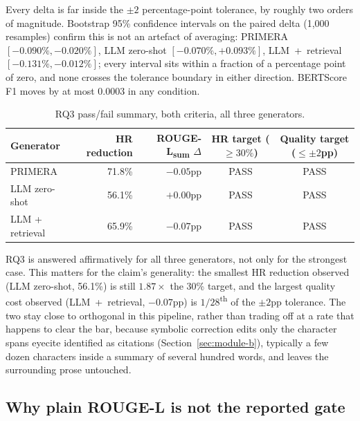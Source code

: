 Every delta is far inside the $\pm 2$ percentage-point tolerance, by roughly two orders of magnitude. Bootstrap 95\% confidence intervals on the paired delta (1{,}000 resamples) confirm this is not an artefact of averaging: PRIMERA $[-0.090\%, -0.020\%]$, LLM zero-shot $[-0.070\%, +0.093\%]$, LLM~+~retrieval $[-0.131\%, -0.012\%]$; every interval sits within a fraction of a percentage point of zero, and none crosses the tolerance boundary in either direction. BERTScore F1 moves by at most 0.0003 in any condition.

\begin{table}[!t]
\centering
\caption{RQ3 pass/fail summary, both criteria, all three generators.}
\label{tab:rq3-pass}
\begin{tabular}{@{}lrrcc@{}}
\toprule
\textbf{Generator} & \textbf{HR reduction} & \textbf{ROUGE-L\textsubscript{sum} $\Delta$} & \textbf{HR target ($\geq 30\%$)} & \textbf{Quality target ($\leq \pm 2$pp)} \\
\midrule
PRIMERA         & 71.8\% & $-0.05$pp & PASS & PASS \\
LLM zero-shot    & 56.1\% & $+0.00$pp & PASS & PASS \\
LLM + retrieval  & 65.9\% & $-0.07$pp & PASS & PASS \\
\bottomrule
\end{tabular}
\end{table}

RQ3 is answered affirmatively for all three generators, not only for the strongest case. This matters for the claim's generality: the smallest HR reduction observed (LLM zero-shot, 56.1\%) is still $1.87\times$ the 30\% target, and the largest quality cost observed (LLM~+~retrieval, $-0.07$pp) is $1/28$\textsuperscript{th} of the $\pm2$pp tolerance. The two stay close to orthogonal in this pipeline, rather than trading off at a rate that happens to clear the bar, because symbolic correction edits only the character spans eyecite identified as citations (Section~\ref{sec:module-b}), typically a few dozen characters inside a summary of several hundred words, and leaves the surrounding prose untouched.

\subsection{Why plain ROUGE-L is not the reported gate}
\label{sec:results-rougeL-note}

